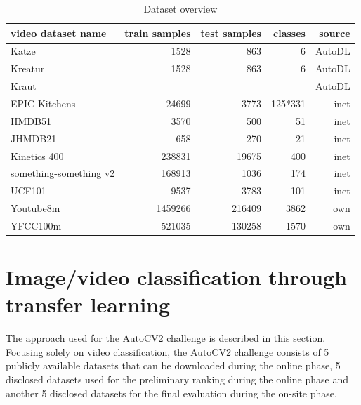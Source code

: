 \documentclass{article}
\begin{document}
\begin{table}
\begin{tabular}{|l|r|r|r|r|}
\hline
\hline
video dataset name & train samples & test samples & classes & source \\
\hline
Katze & 1528 & 863 & 6 & AutoDL \\
Kreatur & 1528 & 863 & 6 & AutoDL \\ 
Kraut & & & & AutoDL \\
EPIC-Kitchens & 24699 & 3773 & 125*331 & inet \\
HMDB51 & 3570 & 500 & 51 & inet \\ 
JHMDB21 & 658 & 270 & 21 & inet \\
Kinetics 400 & 238831 & 19675 & 400 & inet \\
something-something v2 & 168913 & 1036 & 174 & inet \\
UCF101 & 9537 & 3783 & 101 & inet \\
Youtube8m  & 1459266 & 216409 & 3862 & own \\
YFCC100m & 521035 & 130258 & 1570 & own \\
\hline
\end{tabular}
\normalsize
\caption{Dataset overview}
\label{table:datasets}
\end{table}

\section{Image/video classification through transfer learning}
\label{sec:tl}

The approach used for the AutoCV2 challenge is described in this section. Focusing solely on video classification, the AutoCV2 challenge consists of 5 publicly available datasets that can be downloaded during the online phase, 5 disclosed datasets used for the preliminary ranking during the online phase and another 5 disclosed datasets for the final evaluation during the on-site phase. 
\end{document}
